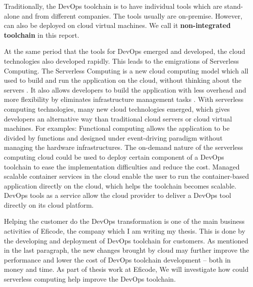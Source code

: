 \par
Traditionally, the DevOps toolchain is to have individual tools which are stand-alone and from different companies. The tools usually are on-premise. However, can also be deployed on cloud virtual machines. We call it
\textbf{non-integrated toolchain} in this report.
\par
At the same period that the tools for DevOps emerged and developed, the cloud technologies also developed rapidly. This leads to the emigrations of Serverless Computing. 
The Serverless Computing is a new cloud computing model which all used to build and run the application on the cloud, without thinking about the servers \cite{Serverle81:online}. It also allows developers to build the application with less overhead \cite{Serverle81:online} and more flexibility by eliminates infrastructure management tasks \cite{Serverle73:online}.
With serverless computing technologies, many new cloud technologies emerged, which gives developers an alternative way than traditional cloud servers or cloud virtual machines. For examples: Functional computing allows the application to be divided by functions and designed under event-driving paradigm without managing the hardware infrastructures. The on-demand nature of the serverless computing cloud could be used to deploy certain component of a DevOps toolchain to ease the implementation difficulties and reduce the cost. Managed scalable container services in the cloud enable the user to run the container-based application directly on the cloud, which helps the toolchain becomes scalable. DevOps tools as a service \cite{DevOpsas45:online} allow the cloud provider to deliver a DevOps tool directly on its cloud platform.
\par
Helping the customer do the DevOps transformation is one of the main business activities of Eficode, the company which I am writing my thesis. This is done by the developing and deployment of DevOps toolchain for customers. As mentioned in the last paragraph, the new changes brought by cloud may further improve the performance and lower the cost of DevOps toolchain development -- both in money and time. As part of thesis work at Eficode, We will investigate how could serverless computing help improve the DevOps toolchain. 
